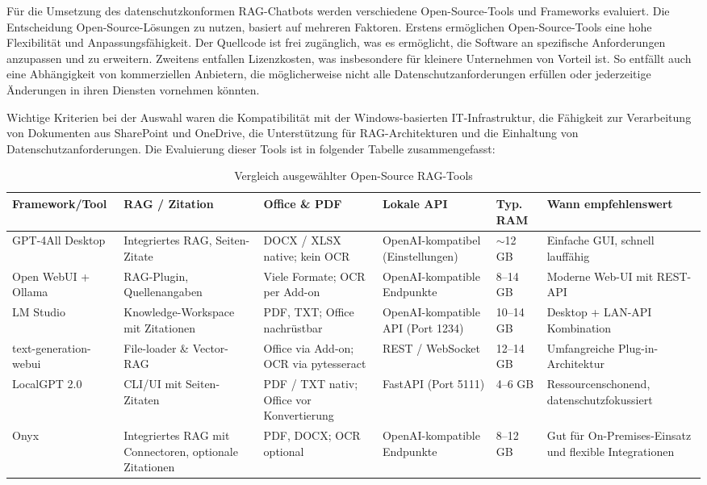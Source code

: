 Für die Umsetzung des datenschutzkonformen RAG-Chatbots werden verschiedene Open-Source-Tools und Frameworks evaluiert.
Die Entscheidung Open-Source-Lösungen zu nutzen, basiert auf mehreren Faktoren.
Erstens ermöglichen Open-Source-Tools eine hohe Flexibilität und Anpassungsfähigkeit.
Der Quellcode ist frei zugänglich, was es ermöglicht, die Software an spezifische Anforderungen anzupassen und zu erweitern.
Zweitens entfallen Lizenzkosten, was insbesondere für kleinere Unternehmen von Vorteil ist.
So entfällt auch eine Abhängigkeit von kommerziellen Anbietern, die möglicherweise nicht alle Datenschutzanforderungen erfüllen oder jederzeitige Änderungen in ihren Diensten vornehmen könnten.

Wichtige Kriterien bei der Auswahl waren die Kompatibilität mit der Windows-basierten IT-Infrastruktur, die Fähigkeit zur Verarbeitung von Dokumenten aus SharePoint und OneDrive, die Unterstützung für RAG-Architekturen und die Einhaltung von Datenschutzanforderungen.
Die Evaluierung dieser Tools ist in folgender Tabelle zusammengefasst:

\begin{table}[htbp]
    \centering
    \small
    \begin{tabular}{lp{1.5cm}p{2.4cm}p{2.2cm}p{1.1cm}p{2.6cm}}
        \toprule
        \textbf{Framework/Tool} & \textbf{RAG / Zitation} & \textbf{Office \& PDF} & \textbf{Lokale API} & \textbf{Typ. RAM} & \textbf{Wann empfehlenswert} \\
        \midrule
        GPT-4All Desktop & Integriertes RAG, Seiten-Zitate & DOCX / XLSX native; kein OCR & OpenAI-kompatibel (Einstellungen) & \(\sim\)12 GB & Einfache GUI, schnell lauffähig \\
        Open WebUI + Ollama & RAG-Plugin, Quellenangaben & Viele Formate; OCR per Add-on & OpenAI-kompatible Endpunkte & 8--14 GB & Moderne Web-UI mit REST-API \\
        LM Studio & Knowledge-Workspace mit Zitationen & PDF, TXT; Office nachrüstbar & OpenAI-kompatible API (Port 1234) & 10--14 GB & Desktop + LAN-API Kombination \\
        text-generation-webui & File-loader \& Vector-RAG & Office via Add-on; OCR via pytesseract & REST / WebSocket & 12--14 GB & Umfangreiche Plug-in-Architektur \\
        LocalGPT 2.0 & CLI/UI mit Seiten-Zitaten & PDF / TXT nativ; Office vor Konvertierung & FastAPI (Port 5111) & 4--6 GB & Ressourcenschonend, datenschutzfokussiert \\
        Onyx & Integriertes RAG mit Connectoren, optionale Zitationen & PDF, DOCX; OCR optional & OpenAI-kompatible Endpunkte & 8--12 GB & Gut für On-Premises-Einsatz und flexible Integrationen \\
        \bottomrule
    \end{tabular}
    \caption{Vergleich ausgewählter Open-Source RAG-Tools}
    \label{tab:rag-tools}
\end{table}


